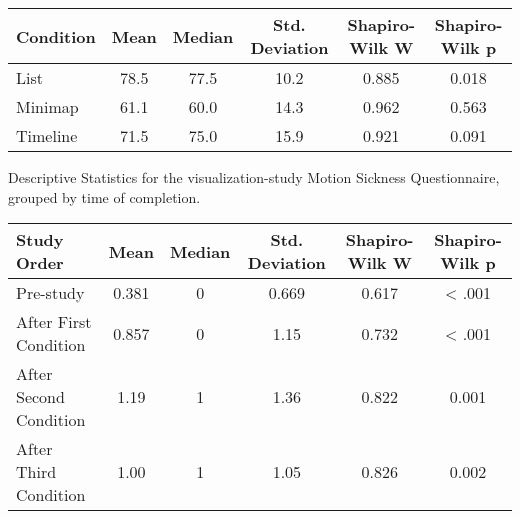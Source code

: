 \begin{center}
\begin{minipage}{\textwidth}
        \vspace{\baselineskip}

    
        \begin{tabular}{lccccc}
            \toprule
            \textbf{Condition} & \textbf{Mean} & \textbf{Median} & \textbf{Std. Deviation} & \textbf{Shapiro-Wilk W} & \textbf{Shapiro-Wilk p} \\
            \midrule
            List & 78.5 & 77.5 & 10.2 & 0.885 & 0.018 \\
            Minimap & 61.1 & 60.0 & 14.3 & 0.962 & 0.563 \\
            Timeline & 71.5 & 75.0 & 15.9 & 0.921 & 0.091 \\
            \bottomrule
        \end{tabular}


        \vspace{\baselineskip}

        
        \caption{Descriptive Statistics for the visualization-study Motion Sickness Questionnaire, grouped by time of completion.}
        \begin{tabular}{lccccc}
            \toprule
            \textbf{Study Order} & \textbf{Mean} & \textbf{Median} & \textbf{Std. Deviation} & \textbf{Shapiro-Wilk W} & \textbf{Shapiro-Wilk p} \\
            \midrule
            Pre-study & 0.381 & 0 & 0.669 & 0.617 & < .001 \\
            After First Condition & 0.857 & 0 & 1.15 & 0.732   & < .001 \\
            After Second Condition & 1.19 & 1 & 1.36 & 0.822   & 0.001  \\
            After Third Condition & 1.00 & 1 & 1.05 & 0.826    & 0.002  \\
            \bottomrule
        \end{tabular}


    \end{minipage}
\end{center}


